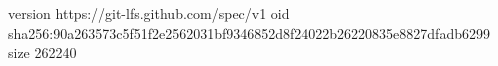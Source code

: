 version https://git-lfs.github.com/spec/v1
oid sha256:90a263573c5f51f2e2562031bf9346852d8f24022b26220835e8827dfadb6299
size 262240
